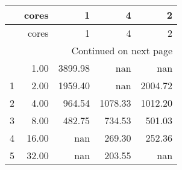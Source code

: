 \begin{longtable}{lrrrr}
	\timetable{10000}
\toprule
 & cores & 1 & 4 & 2 \\
\midrule
\endfirsthead
\toprule
 & cores & 1 & 4 & 2 \\
\midrule
\endhead
\midrule
\multicolumn{5}{r}{Continued on next page} \\
\midrule
\endfoot
\bottomrule
\endlastfoot
0 & 1.00 & 3899.98 & nan & nan \\
1 & 2.00 & 1959.40 & nan & 2004.72 \\
2 & 4.00 & 964.54 & 1078.33 & 1012.20 \\
3 & 8.00 & 482.75 & 734.53 & 501.03 \\
4 & 16.00 & nan & 269.30 & 252.36 \\
5 & 32.00 & nan & 203.55 & nan \\
\end{longtable}


